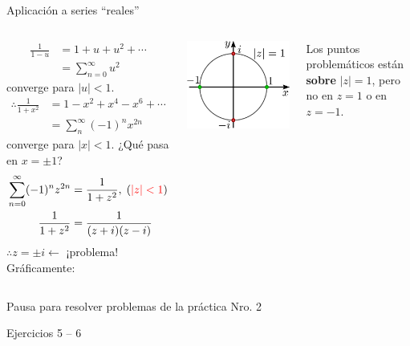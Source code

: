 \documentclass[9pt, aspectratio=169]{beamer}
\begin{document}
\begin{frame}{Aplicación a series ``reales''}
    \begin{columns}[c]
    \begin{align*}
    \frac{1}{1 - u} &= 1 + u + u^2 + \cdots \\
                    &= \sum_{n = 0}^{\infty} u^2
    \end{align*}
    converge para $|u| < 1$.
    \begin{align*}
    \therefore \frac{1}{1 + x^2} &= 1 - x^2 + x^4 - x^6 + \cdots \\
                                 &= \sum_{n}^{\infty} (-1)^n x^{2n}
    \end{align*}
    converge para $|x| < 1$.
    ¿Qué pasa en $x = \pm 1$?
    \begin{align*}
        \sum_{n = 0}^{\infty} (-1)^n z^{2n} &= \frac{1}{1 + z^2}, \; ({\color{red}|z| < 1}) \\
    \frac{1}{1 + z^2} &= \frac{1}{(z + i)(z -i)}
    \end{align*}
$\therefore z = \pm i \leftarrow $ \alert{¡problema!}
    Gráficamente:
    \begin{center}
    \includegraphics[scale=0.40]{figs/fig-09.pdf}
    \end{center}
    Los puntos problemáticos están \textbf{sobre} $|z| = 1$, pero no en $z = 1$ o en $z = -1$.
    \end{columns}
\end{frame}

\begin{frame}[standout]
Pausa para resolver problemas de la práctica Nro. 2

Ejercicios 5 -- 6
\end{frame}
\end{document}

